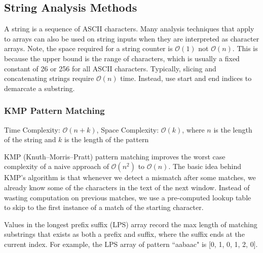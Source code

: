 \documentclass{article}
\newcommand{\bigO}{\mathcal{O}}
\begin{document}
    
    \subsection{String Analysis Methods}
    A string is a sequence of ASCII characters. Many analysis techniques that apply to arrays can also be used on string inputs when they are interpreted as character arrays. Note, the space required for a string counter is $\bigO(1)$ not $\bigO(n)$. This is because the upper bound is the range of characters, which is usually a fixed constant of 26 or 256 for all ASCII characters. Typically, slicing and concatenating strings require $\bigO(n)$ time. Instead, use start and end indices to demarcate a substring.
    
    \subsubsection{KMP Pattern Matching}
    Time Complexity: $\bigO(n + k)$, Space Complexity: $\bigO(k)$, where $n$ is the length of the string and $k$ is the length of the pattern
    
    KMP (Knuth--Morris--Pratt) pattern matching improves the worst case complexity of a naive approach of $\bigO(n^2)$ to $\bigO(n)$. The basic idea behind KMP’s algorithm is that whenever we detect a mismatch after some matches, we already know some of the characters in the text of the next window. Instead of wasting computation on previous matches, we use a pre-computed lookup table to skip to the first instance of a match of the starting character.
    
    Values in the longest prefix suffix (LPS) array record the max length of matching substrings that exists as both a prefix and suffix, where the suffix ends at the current index. For example, the LPS array of pattern ``aabaac" is [0, 1, 0, 1, 2, 0].
    
\end{document}

